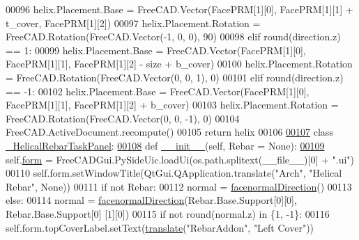 \begin{DoxyCode}
00096         helix.Placement.Base = FreeCAD.Vector(FacePRM[1][0], FacePRM[1][1] + t\_cover, FacePRM[1][2])
00097         helix.Placement.Rotation = FreeCAD.Rotation(FreeCAD.Vector(-1, 0, 0), 90)
00098     \textcolor{keywordflow}{elif} round(direction.z) == 1:
00099         helix.Placement.Base = FreeCAD.Vector(FacePRM[1][0], FacePRM[1][1], FacePRM[1][2] - size + b\_cover)
00100         helix.Placement.Rotation = FreeCAD.Rotation(FreeCAD.Vector(0, 0, 1), 0)
00101     \textcolor{keywordflow}{elif} round(direction.z) == -1:
00102         helix.Placement.Base = FreeCAD.Vector(FacePRM[1][0], FacePRM[1][1], FacePRM[1][2] + b\_cover)
00103         helix.Placement.Rotation = FreeCAD.Rotation(FreeCAD.Vector(0, 0, -1), 0)
00104     FreeCAD.ActiveDocument.recompute()
00105     \textcolor{keywordflow}{return} helix
00106 
\hypertarget{HelicalRebar_8py_source.tex_l00107}{}\hyperlink{classHelicalRebar_1_1__HelicalRebarTaskPanel}{00107} \textcolor{keyword}{class }\hyperlink{classHelicalRebar_1_1__HelicalRebarTaskPanel}{\_HelicalRebarTaskPanel}:
\hypertarget{HelicalRebar_8py_source.tex_l00108}{}\hyperlink{classHelicalRebar_1_1__HelicalRebarTaskPanel_a1bc9ff9f8e2cdbf9f12d974dd77c8e24}{00108}     \textcolor{keyword}{def }\hyperlink{classHelicalRebar_1_1__HelicalRebarTaskPanel_a1bc9ff9f8e2cdbf9f12d974dd77c8e24}{\_\_init\_\_}(self, Rebar = None):
\hypertarget{HelicalRebar_8py_source.tex_l00109}{}\hyperlink{classHelicalRebar_1_1__HelicalRebarTaskPanel_abfda021716a5b0cd386be846e989ea5f}{00109}         self.\hyperlink{classHelicalRebar_1_1__HelicalRebarTaskPanel_abfda021716a5b0cd386be846e989ea5f}{form} = FreeCADGui.PySideUic.loadUi(os.path.splitext(\_\_file\_\_)[0] + \textcolor{stringliteral}{".ui"})
00110         self.form.setWindowTitle(QtGui.QApplication.translate(\textcolor{stringliteral}{"Arch"}, \textcolor{stringliteral}{"Helical Rebar"}, \textcolor{keywordtype}{None}))
00111         \textcolor{keywordflow}{if} \textcolor{keywordflow}{not} Rebar:
00112             normal = \hyperlink{namespaceRebarfunc_a3a8c123c290609baec3a547c20a561b9}{facenormalDirection}()
00113         \textcolor{keywordflow}{else}:
00114             normal = \hyperlink{namespaceRebarfunc_a3a8c123c290609baec3a547c20a561b9}{facenormalDirection}(Rebar.Base.Support[0][0], Rebar.Base.Support[0]
      [1][0])
00115         \textcolor{keywordflow}{if} \textcolor{keywordflow}{not} round(normal.z) \textcolor{keywordflow}{in} \{1, -1\}:
00116             self.form.topCoverLabel.setText(\hyperlink{namespaceRebarfunc_a1467a55852e36c36c472e222855bb937}{translate}(\textcolor{stringliteral}{"RebarAddon"}, \textcolor{stringliteral}{"Left Cover"}))

\end{DoxyCode}

